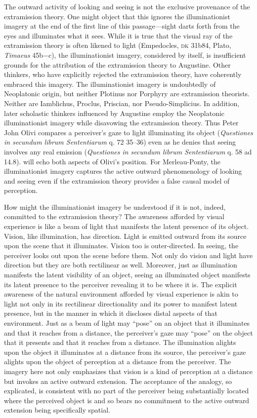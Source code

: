 \documentclass[12pt]{article}
\begin{document}
The outward activity of looking and seeing is not the exclusive provenance of the extramission theory. One might object that this ignores the illuminationist imagery at the end of the first line of this passage---sight darts forth from the eyes and illuminates what it sees. While it is true that the visual ray of the extramission theory is often likened to light (Empedocles, \textsc{dk} 31b84, Plato, \emph{Timaeus} 45b−c), the illuminationist imagery, considered by itself, is insufficient grounds for the attribution of the extramission theory to Augustine. Other thinkers, who have explicitly rejected the extramission theory, have coherently embraced this imagery. The illuminationist imagery is undoubtedly of Neoplatonic origin, but neither Plotinus nor Porphyry are extramission theorists. Neither are Iamblichus, Proclus, Priscian, nor Pseudo-Simplicius. In addition, later scholastic thinkers influenced by Augustine employ the Neoplatonic illuminationist imagery while disavowing the extramission theory. Thus Peter John Olivi compares a perceiver's gaze to light illuminating its object (\emph{Questiones in secundum librum Sententiarum} q. 72 35–36) even as he denies that seeing involves any real emission (\emph{Questiones in secundum librum Sententiarum} q. 58 ad 14.8). \citet[185]{Merleau-Ponty:1967fj} will echo both aspects of Olivi's position. For Merleau-Ponty, the illuminationist imagery captures the active outward phenomenology of looking and seeing even if the extramission theory provides a false causal model of perception. 

How might the illuminationist imagery be understood if it is not, indeed, committed to the extramission theory? The awareness afforded by visual experience is like a beam of light that manifests the latent presence of its object. Vision, like illumination, has direction. Light is emitted outward from its source upon the scene that it illuminates. Vision too is outer-directed. In seeing, the perceiver looks out upon the scene before them. Not only do vision and light have direction but they are both rectilinear as well. Moreover, just as illumination manifests the latent visibility of an object, seeing an illuminated object manifests its latent presence to the perceiver revealing it to be where it is. The explicit awareness of the natural environment afforded by visual experience is akin to light not only in its rectilinear directionality and its power to manifest latent presence, but in the manner in which it discloses distal aspects of that environment. Just as a beam of light may “pose” on an object that it illuminates and that it reaches from a distance, the perceiver’s gaze may “pose” on the object that it presents and that it reaches from a distance. The illumination alights upon the object it illuminates at a distance from its source, the perceiver’s gaze alights upon the object of perception at a distance from the perceiver. The imagery here not only emphasizes that vision is a kind of perception at a distance but invokes an active outward extension. The acceptance of the analogy, so explicated, is consistent with no part of the perceiver being substantially located where the perceived object is and so bears no commitment to the active outward extension being specifically spatial. 
\end{document}
